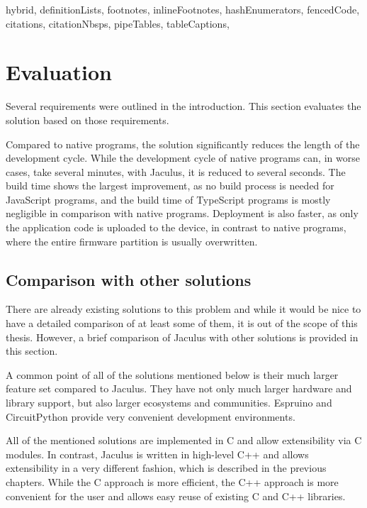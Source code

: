 \begin{markdown*}{%
  hybrid,
  definitionLists,
  footnotes,
  inlineFootnotes,
  hashEnumerators,
  fencedCode,
  citations,
  citationNbsps,
  pipeTables,
  tableCaptions,
}


\chapter{Evaluation}

Several requirements were outlined in the introduction. This section evaluates the solution based on those requirements.

Compared to native programs, the solution significantly reduces the length of the development cycle. While the development cycle of native programs can, in worse cases, take several minutes, with Jaculus, it is reduced to several seconds. The build time shows the largest improvement, as no build process is needed for JavaScript programs, and the build time of TypeScript programs is mostly negligible in comparison with native programs. Deployment is also faster, as only the application code is uploaded to the device, in contrast to native programs, where the entire firmware partition is usually overwritten.

\section{Comparison with other solutions}

There are already existing solutions to this problem and while it would be nice to have a detailed comparison of at least some of them, it is out of the scope of this thesis. However, a brief comparison of Jaculus with other solutions is provided in this section.

A common point of all of the solutions mentioned below is their much larger feature set compared to Jaculus. They have not only much larger hardware and library support, but also larger ecosystems and communities. Espruino and CircuitPython provide very convenient development environments.

All of the mentioned solutions are implemented in C and allow extensibility via C modules. In contrast, Jaculus is written in high-level C++ and allows extensibility in a very different fashion, which is described in the previous chapters. While the C approach is more efficient, the C++ approach is more convenient for the user and allows easy reuse of existing C and C++ libraries.


\end{markdown*}
